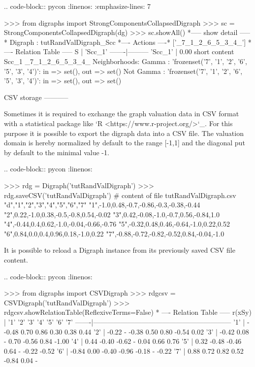 {.. code-block:: pycon
   :linenos:
   :emphasize-lines: 7

   >>> from digraphs import StrongComponentsCollapsedDigraph
   >>> sc = StrongComponentsCollapsedDigraph(dg)
   >>> sc.showAll()
    *----- show detail -----*
    Digraph          : tutRandValDigraph_Scc
    *---- Actions ----*
    ['_7_1_2_6_5_3_4_']
    * ---- Relation Table -----
      S     |  'Scc_1'	  
     -------|---------
    'Scc_1' |  0.00	 
    short 	 content
    Scc_1 	 _7_1_2_6_5_3_4_
    Neighborhoods:
      Gamma     :
    'frozenset({'7', '1', '2', '6', '5', '3', '4'})': in => set(), out => set()
      Not Gamma :
    'frozenset({'7', '1', '2', '6', '5', '3', '4'})': in => set(), out => set()

CSV storage
-----------

Sometimes it is required to exchange the graph valuation data in CSV format with a statistical package like `R <https://www.r-project.org/>`_. For this purpose it is possible to export the digraph data into a CSV file. The valuation domain is hereby normalized by default to the range [-1,1] and the diagonal put by default to the minimal value -1.

.. code-block:: pycon
   :linenos:

   >>> rdg = Digraph('tutRandValDigraph')
   >>> rdg.saveCSV('tutRandValDigraph')
    # content of file tutRandValDigraph.csv
    "d","1","2","3","4","5","6","7"
    "1",-1.0,0.48,-0.7,-0.86,-0.3,-0.38,-0.44
    "2",0.22,-1.0,0.38,-0.5,-0.8,0.54,-0.02
    "3",0.42,-0.08,-1.0,-0.7,0.56,-0.84,1.0
    "4",-0.44,0.4,0.62,-1.0,-0.04,-0.66,-0.76
    "5",-0.32,0.48,0.46,-0.64,-1.0,0.22,0.52
    "6",0.84,0.0,0.4,0.96,0.18,-1.0,0.22
    "7",-0.88,-0.72,-0.82,-0.52,0.84,-0.04,-1.0

It is possible to reload a Digraph instance from its previously saved CSV file content.

.. code-block:: pycon
   :linenos:

   >>> from digraphs import CSVDigraph   
   >>> rdgcsv = CSVDigraph('tutRandValDigraph')
   >>> rdgcsv.showRelationTable(ReflexiveTerms=False)
    * ---- Relation Table -----
    r(xSy) |   '1'   '2'   '3'   '4'   '5'   '6'   '7'	  
    -------|------------------------------------------------------------
    '1'    |   -   -0.48  0.70  0.86  0.30  0.38  0.44	 
    '2'    | -0.22   -   -0.38  0.50  0.80 -0.54  0.02	 
    '3'    | -0.42  0.08   -    0.70 -0.56  0.84 -1.00	 
    '4'    |  0.44 -0.40 -0.62   -    0.04  0.66  0.76	 
    '5'    |  0.32 -0.48 -0.46  0.64   -   -0.22 -0.52	 
    '6'    | -0.84  0.00 -0.40 -0.96 -0.18   -   -0.22	 
    '7'    |  0.88  0.72  0.82  0.52 -0.84  0.04   -

}

